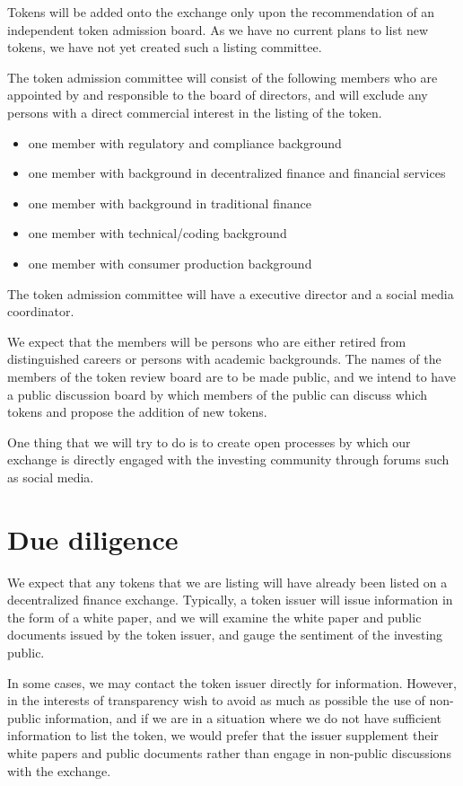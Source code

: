 Tokens will be added onto the exchange only upon the recommendation of
an independent token admission board.  As we have no current plans to
list new tokens, we have not yet created such a listing committee.

The token admission committee will consist of the following members
who are appointed by and responsible to the board of directors, and
will exclude any persons with a direct commercial interest in the
listing of the token.

\begin{itemize}
  \item one member with regulatory and compliance background
  \item one member with background in decentralized finance and
    financial services
  \item one member with background in traditional finance
  \item one member with technical/coding background
  \item one member with consumer production background
\end{itemize}

The token admission committee will have a executive director and a
social media coordinator.

We expect that the members will be persons who are either retired from
distinguished careers or persons with academic backgrounds.  The names
of the members of the token review board are to be made public, and we
intend to have a public discussion board by which members of the
public can discuss which tokens and propose the addition of new
tokens.

One thing that we will try to do is to create open processes by which
our exchange is directly engaged with the investing community through
forums such as social media.

\section{Due diligence}

We expect that any tokens that we are listing will have already been
listed on a decentralized finance exchange.  Typically, a token issuer
will issue information in the form of a white paper, and we will
examine the white paper and public documents issued by the token
issuer, and gauge the sentiment of the investing public.

In some cases, we may contact the token issuer directly for
information.  However, in the interests of transparency wish to avoid
as much as possible the use of non-public information, and if we are
in a situation where we do not have sufficient information to list the
token, we would prefer that the issuer supplement their white papers
and public documents rather than engage in non-public discussions with
the exchange.

